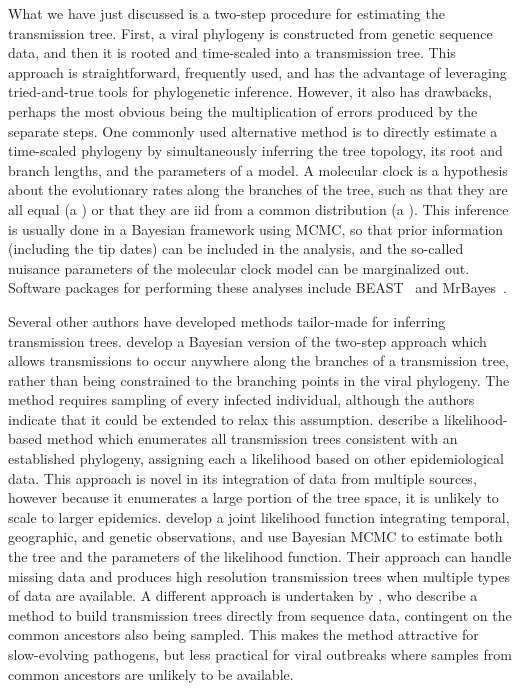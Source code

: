 What we have just discussed is a two-step procedure for estimating the
transmission tree. First, a viral phylogeny is constructed from genetic
sequence data, and then it is rooted and time-scaled into a transmission tree.
This approach is straightforward, frequently used, and has the advantage of
leveraging tried-and-true tools for phylogenetic inference. However, it also
has drawbacks, perhaps the most obvious being the multiplication of errors
produced by the separate steps. One commonly used alternative method is to
directly estimate a time-scaled phylogeny by simultaneously inferring the tree
topology, its root and branch lengths, and the parameters of a  model. A molecular clock is a hypothesis about the evolutionary rates
along the branches of the tree, such as that they are all equal (a ) or that they are \gls{iid} from a common distribution (a ). This inference is usually done in a Bayesian framework using
\gls{MCMC}, so that prior information (including the tip dates) 
can be included in the analysis, and the so-called nuisance parameters of the
molecular clock model can be marginalized out. Software packages for performing
these analyses include BEAST~\autocite{bouckaert2014beast} and
MrBayes~\autocite{ronquist2012mrbayes}.

Several other authors have developed methods tailor-made for inferring
transmission trees. \textcite{didelot2014bayesian} develop a Bayesian version
of the two-step approach which allows transmissions to occur anywhere along the
branches of a transmission tree, rather than being constrained to the branching
points in the viral phylogeny. The method requires sampling of every infected
individual, although the authors indicate that it could be extended to relax
this assumption. \textcite{cottam2008integrating} describe a likelihood-based
method which enumerates all transmission trees consistent with an established
phylogeny, assigning each a likelihood based on other epidemiological data. 
This approach is novel in its integration of data from multiple sources,
however because it enumerates a large portion of the tree space, it is unlikely
to scale to larger epidemics. \textcite{ypma2012unravelling} develop a joint 
likelihood function integrating temporal, geographic, and genetic observations, 
and use Bayesian \gls{MCMC} to estimate both the tree and the parameters of the
likelihood function. Their approach can handle missing data and produces high
resolution transmission trees when multiple types of data are available. A
different approach is undertaken by \textcite{jombart2011reconstructing}, who
describe a method to build transmission trees directly from sequence data,
contingent on the common ancestors also being sampled. This makes the method
attractive for slow-evolving pathogens, but less practical for viral outbreaks
where samples from common ancestors are unlikely to be available.


